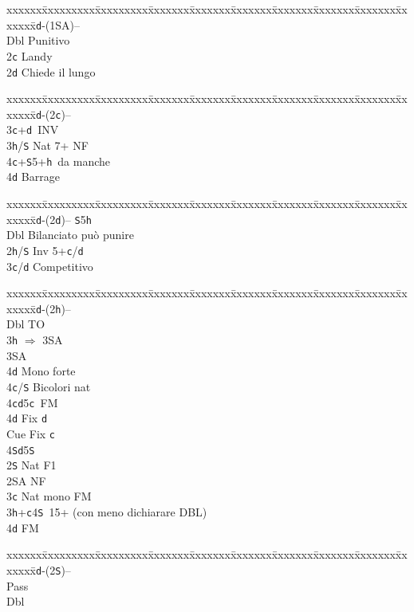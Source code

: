 \documentclass[a4paper,italian]{article}
\newcommand{\BS}{\small{\texttt{S}}}
\newcommand{\BC}{\small{\texttt{c}}}
\newcommand{\BD}{\small{\texttt{d}}}
\newcommand{\BH}{\small{\texttt{h}}}
\newenvironment{bidtable}
{\begin{tabbing}

    xxxxxx\=xxxxxxxxx\=xxxxxxxxx\=xxxxxxx\=xxxxxxx\=xxxxxxx\=xxxxxxx\=xxxxxxx\=xxxxxxx\=xxxxxxx\=\kill}
{\end{tabbing} }%
\begin{document}
\begin{multicols}{2}
    \begin{bidtable}
        1\BD-(1\small{SA})--\+\\
        Dbl \> Punitivo\\
        2\BC \> Landy\+\\
        2\BD \> Chiede il lungo\-\-
    \end{bidtable}
    \begin{bidtable}
        1\BD-(2\BC)--\+\\
        3\BC {}+\BD\ INV\\
        3\BH/\BS \> Nat 7+ NF\\
        4\BC {}+\BS 5+\BH\ da manche\\
        4\BD \> Barrage\-
    \end{bidtable}
    \begin{bidtable}
        1\BD-(2\BD)-- \> \BS 5\BH \+\\
        Dbl \> Bilanciato può punire\\
        2\BH/\BS \> Inv 5+\BC /\BD \\
        3\BC/\BD \> Competitivo\-
    \end{bidtable}
    \begin{bidtable}
        1\BD-(2\BH)--\+\\
        Dbl \> TO\+\\
        3\BH\> $\Rightarrow$ 3\small{SA}\+\\
        3\small{SA}\+\\
        4\BD\> Mono forte\\
        4\BC/\BS\> Bicolori nat \-\-\\
        4\BC{}\BD5\BC\ FM\+\\
        4\BD\> Fix \BD\\
        Cue\> Fix \BC\-\\
        4\BS{}\BD5\BS\-\\
        2\BS \> Nat F1\\
        2\small{SA} \> NF\\
        3\BC \> Nat mono FM\\
        3\BH {}+\BC 4\BS\ 15+ (con meno dichiarare DBL)\\
        4\BD \> FM\-
    \end{bidtable}
    \begin{bidtable}
        1\BD-(2\BS)--\+\\
        Pass\+\\
        Dbl\+\\

\end{bidtable}
\end{multicols}
\end{document}
